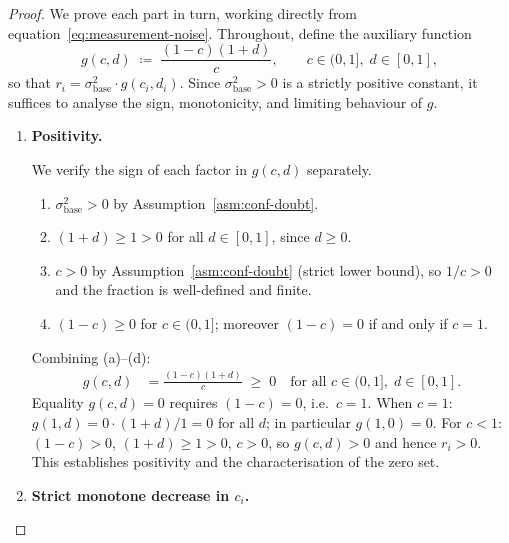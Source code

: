 \documentclass[12pt,openany]{book}
\numberwithin{equation}{chapter}
\theoremstyle{plain}
\theoremstyle{definition}
\theoremstyle{remark}
\begin{document}
\begin{proof}
We prove each part in turn, working directly from
equation~\eqref{eq:measurement-noise}.  Throughout, define the
auxiliary function
\begin{equation}
  g(c, d) \;\coloneqq\; \frac{(1-c)(1+d)}{c},
  \qquad c \in (0,1],\; d \in [0,1],
  \label{eq:aux-g}
\end{equation}
so that $r_i = \sigma_{\mathrm{base}}^2 \cdot g(c_i, d_i)$.
Since $\sigma_{\mathrm{base}}^2 > 0$ is a strictly positive
constant, it suffices to analyse the sign, monotonicity, and
limiting behaviour of $g$.

\begin{enumerate}

  \item \textbf{Positivity.}

  We verify the sign of each factor in $g(c,d)$ separately.

  \begin{enumerate}
    \item[(a)] $\sigma_{\mathrm{base}}^2 > 0$ by
          Assumption~\ref{asm:conf-doubt}.
    \item[(b)] $(1 + d) \geq 1 > 0$ for all $d \in [0,1]$,
          since $d \geq 0$.
    \item[(c)] $c > 0$ by Assumption~\ref{asm:conf-doubt}
          (strict lower bound), so $1/c > 0$ and the fraction
          is well-defined and finite.
    \item[(d)] $(1 - c) \geq 0$ for $c \in (0,1]$; moreover
          $(1-c) = 0$ if and only if $c = 1$.
  \end{enumerate}

  Combining (a)--(d):
  \begin{align}
    g(c,d) &= \frac{(1-c)(1+d)}{c} \;\geq\; 0
    \quad \text{for all } c \in (0,1],\; d \in [0,1].
    \label{eq:g-nonneg}
  \end{align}
  Equality $g(c,d) = 0$ requires $(1-c) = 0$, i.e.\ $c = 1$.
  When $c = 1$: $g(1, d) = 0 \cdot (1+d) / 1 = 0$ for all
  $d$; in particular $g(1, 0) = 0$.
  For $c < 1$: $(1-c) > 0$, $(1+d) \geq 1 > 0$, $c > 0$, so
  $g(c,d) > 0$ and hence $r_i > 0$.
  This establishes positivity and the characterisation of the
  zero set.

  \item \textbf{Strict monotone decrease in $c_i$.}


\end{enumerate}
\end{proof}
\end{document}
